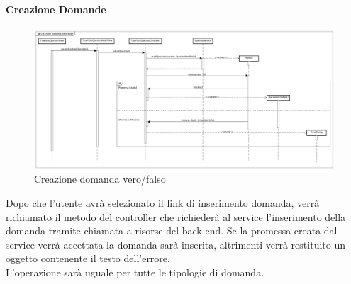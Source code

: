 \paragraph{Creazione Domande}

\label{Creazione domanda vero/falso}

\begin{figure}[ht]
	\centering
	\includegraphics[scale=0.25,keepaspectratio]{UML/DiagrammiDiSequenza/Front-end/TrueFalseQuestionCreation.png}
	\caption{Creazione domanda vero/falso}
\end{figure} \FloatBarrier

Dopo che l'utente avrà selezionato il link di inserimento domanda, verrà richiamato il metodo del controller che richiederà al service l'inserimento della domanda tramite chiamata a risorse del back-end. Se la promessa creata dal service verrà accettata la domanda sarà inserita, altrimenti verrà restituito un oggetto contenente il testo dell'errore. \\ L'operazione sarà uguale per tutte le tipologie di domanda. 